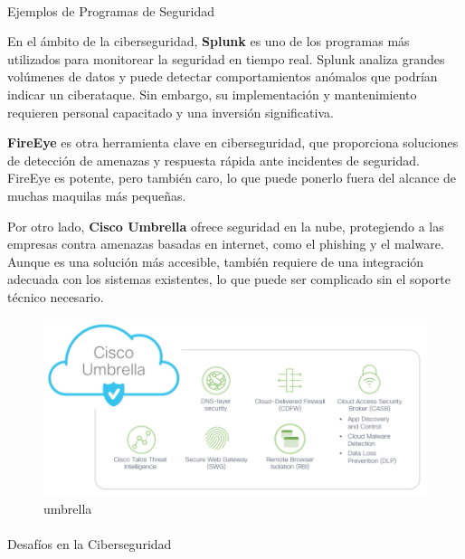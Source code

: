 \documentclass[
  10pt,
  letterpaper,
]{book}
\makeatletter
\let\oldparagraph\paragraph
\renewcommand{\paragraph}{
    \@ifstar
      \xxxParagraphStar
      \xxxParagraphNoStar
  }
\newcommand{\xxxParagraphStar}[1]{\oldparagraph*{#1}\mbox{}}
\newcommand{\xxxParagraphNoStar}[1]{\oldparagraph{#1}\mbox{}}
\makeatother
\begin{document}
\paragraph{Ejemplos de Programas de
Seguridad}\label{ejemplos-de-programas-de-seguridad}

En el ámbito de la ciberseguridad, \textbf{Splunk} es uno de los
programas más utilizados para monitorear la seguridad en tiempo real.
Splunk analiza grandes volúmenes de datos y puede detectar
comportamientos anómalos que podrían indicar un ciberataque. Sin
embargo, su implementación y mantenimiento requieren personal capacitado
y una inversión significativa.

\textbf{FireEye} es otra herramienta clave en ciberseguridad, que
proporciona soluciones de detección de amenazas y respuesta rápida ante
incidentes de seguridad. FireEye es potente, pero también caro, lo que
puede ponerlo fuera del alcance de muchas maquilas más pequeñas.

Por otro lado, \textbf{Cisco Umbrella} ofrece seguridad en la nube,
protegiendo a las empresas contra amenazas basadas en internet, como el
phishing y el malware. Aunque es una solución más accesible, también
requiere de una integración adecuada con los sistemas existentes, lo que
puede ser complicado sin el soporte técnico necesario.

\begin{figure}[H]

{\centering \includegraphics{Img/cisco.png}

}

\caption{umbrella}

\end{figure}%

\paragraph{Desafíos en la
Ciberseguridad}\label{desafuxedos-en-la-ciberseguridad}
\end{document}
